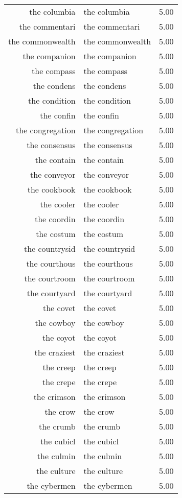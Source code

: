 \begin{table}[ht]
\begin{tabular}{rlr}
  the columbia & the columbia & 5.00 \\ 
  the commentari & the commentari & 5.00 \\ 
  the commonwealth & the commonwealth & 5.00 \\ 
  the companion & the companion & 5.00 \\ 
  the compass & the compass & 5.00 \\ 
  the condens & the condens & 5.00 \\ 
  the condition & the condition & 5.00 \\ 
  the confin & the confin & 5.00 \\ 
  the congregation & the congregation & 5.00 \\ 
  the consensus & the consensus & 5.00 \\ 
  the contain & the contain & 5.00 \\ 
  the conveyor & the conveyor & 5.00 \\ 
  the cookbook & the cookbook & 5.00 \\ 
  the cooler & the cooler & 5.00 \\ 
  the coordin & the coordin & 5.00 \\ 
  the costum & the costum & 5.00 \\ 
  the countrysid & the countrysid & 5.00 \\ 
  the courthous & the courthous & 5.00 \\ 
  the courtroom & the courtroom & 5.00 \\ 
  the courtyard & the courtyard & 5.00 \\ 
  the covet & the covet & 5.00 \\ 
  the cowboy & the cowboy & 5.00 \\ 
  the coyot & the coyot & 5.00 \\ 
  the craziest & the craziest & 5.00 \\ 
  the creep & the creep & 5.00 \\ 
  the crepe & the crepe & 5.00 \\ 
  the crimson & the crimson & 5.00 \\ 
  the crow & the crow & 5.00 \\ 
  the crumb & the crumb & 5.00 \\ 
  the cubicl & the cubicl & 5.00 \\ 
  the culmin & the culmin & 5.00 \\ 
  the culture & the culture & 5.00 \\ 
  the cybermen & the cybermen & 5.00 \\ 

\end{tabular}
\end{table}
